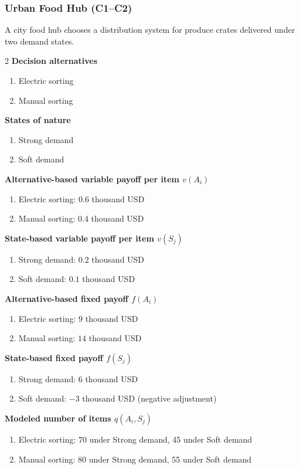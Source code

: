	\subsubsection{Urban Food Hub (C1--C2)}
	\label{sec:problem34-urban-food-hub-c1-c2}
	A city food hub chooses a distribution system for produce crates delivered under two demand states.
	\begin{multicols}{2}
	\textbf{Decision alternatives}
	\begin{enumerate}[label=\arabic*.]
\item Electric sorting
\item Manual sorting
	\end{enumerate}
	\textbf{States of nature}
	\begin{enumerate}[label=\arabic*.]
\item Strong demand
\item Soft demand
	\end{enumerate}
	\columnbreak
	\textbf{Alternative-based variable payoff per item $v(A_i)$}
\begin{enumerate}[label=\arabic*.]
\item Electric sorting: $0.6$ thousand USD
\item Manual sorting: $0.4$ thousand USD\end{enumerate}
\textbf{State-based variable payoff per item $v(S_j)$}
\begin{enumerate}[label=\arabic*.]
\item Strong demand: $0.2$ thousand USD
\item Soft demand: $0.1$ thousand USD\end{enumerate}
\textbf{Alternative-based fixed payoff $f(A_i)$}
\begin{enumerate}[label=\arabic*.]
\item Electric sorting: $9$ thousand USD
\item Manual sorting: $14$ thousand USD\end{enumerate}
\textbf{State-based fixed payoff $f(S_j)$}
\begin{enumerate}[label=\arabic*.]
\item Strong demand: $6$ thousand USD
\item Soft demand: $-3$ thousand USD (negative adjustment)\end{enumerate}
\textbf{Modeled number of items $q(A_i,S_j)$}
\begin{enumerate}[label=\arabic*.]
\item Electric sorting: 70 under Strong demand, 45 under Soft demand
\item Manual sorting: 80 under Strong demand, 55 under Soft demand
\end{enumerate}
	\end{multicols}

